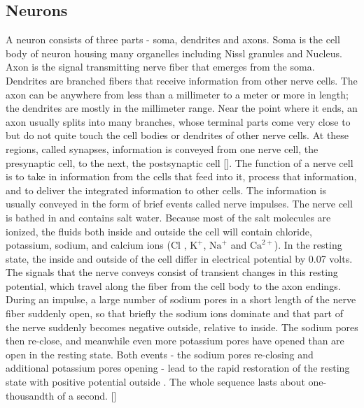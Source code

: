 \documentclass[MTech]{iitmdiss}
\newcommand{\plt}{thesis_plots}
\begin{document}
\subsection{Neurons} %
\label{sub:neurons}
A neuron consists of three parts - soma, dendrites and axons. Soma is the cell body of neuron housing many organelles including Nissl granules and Nucleus. Axon is the signal transmitting nerve fiber that emerges from the soma. Dendrites are branched fibers that receive information from other nerve cells. The axon can be anywhere from less than a millimeter to a meter or more in length; the dendrites are mostly in the millimeter range. Near the point where it ends, an axon usually splits into many branches, whose terminal parts come very close to but do not quite touch the cell bodies or dendrites of other nerve cells. At these regions, called synapses, information is conveyed from one nerve cell, the presynaptic cell, to the next, the postsynaptic cell [\cite{hubel1995eye}].
The function of a nerve cell is to take in information from the cells that feed into it, process that information, and to deliver the integrated information to other cells. The information is usually conveyed in the form of brief events called nerve impulses. The nerve cell is bathed in and contains salt water. Because most of the salt molecules are ionized, the fluids both inside and outside the cell will contain chloride, potassium, sodium, and calcium ions (Cl , $\text{K}^+$, $\text{Na}^+$ and $\text{Ca}^{2+}$).
In the resting state, the inside and outside of the cell differ in electrical potential by 0.07 volts. The signals that the nerve conveys consist of transient changes in this resting potential, which travel along the fiber from the cell body to the axon endings. During an impulse, a large number of sodium pores in a short length of the nerve fiber suddenly open, so that briefly the sodium ions dominate and that part of the nerve suddenly becomes negative outside, relative to inside. The sodium pores then re-close, and meanwhile even more potassium pores have opened than are open in the resting state. Both events - the sodium pores re-closing and additional potassium pores opening - lead to the rapid restoration of the resting state with positive potential outside . The whole sequence lasts about one-thousandth of a second. [\cite{hubel1995eye}]
\end{document}
